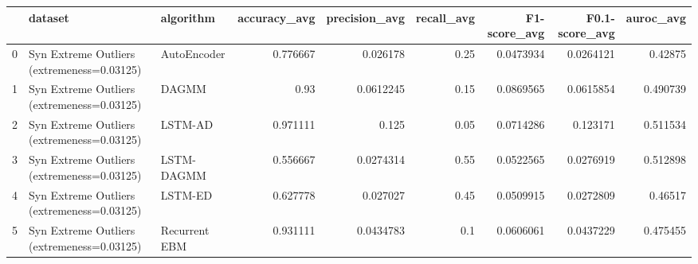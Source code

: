 \begin{tabular}{rllrrrrrr}
\hline
    & dataset                                    & algorithm     &   accuracy\_avg &   precision\_avg &   recall\_avg &   F1-score\_avg &   F0.1-score\_avg &   auroc\_avg \\
\hline
  0 & Syn Extreme Outliers (extremeness=0.03125) & AutoEncoder   &       0.776667 &       0.026178  &         0.25 &      0.0473934 &        0.0264121 &    0.42875  \\
  1 & Syn Extreme Outliers (extremeness=0.03125) & DAGMM         &       0.93     &       0.0612245 &         0.15 &      0.0869565 &        0.0615854 &    0.490739 \\
  2 & Syn Extreme Outliers (extremeness=0.03125) & LSTM-AD       &       0.971111 &       0.125     &         0.05 &      0.0714286 &        0.123171  &    0.511534 \\
  3 & Syn Extreme Outliers (extremeness=0.03125) & LSTM-DAGMM    &       0.556667 &       0.0274314 &         0.55 &      0.0522565 &        0.0276919 &    0.512898 \\
  4 & Syn Extreme Outliers (extremeness=0.03125) & LSTM-ED       &       0.627778 &       0.027027  &         0.45 &      0.0509915 &        0.0272809 &    0.46517  \\
  5 & Syn Extreme Outliers (extremeness=0.03125) & Recurrent EBM &       0.931111 &       0.0434783 &         0.1  &      0.0606061 &        0.0437229 &    0.475455 \\
\hline
\end{tabular}

